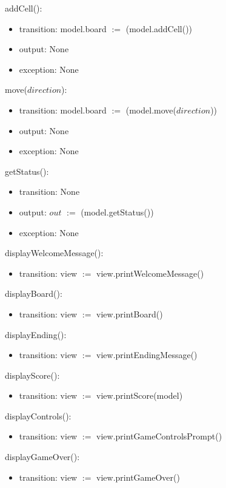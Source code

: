 \documentclass[12pt]{article}
\begin{document}
\noindent addCell():
\begin{itemize}
  \item transition: model.board $:=$ (model.addCell())
  \item output: None
  \item exception: None
\end{itemize}

\noindent move($direction$):
\begin{itemize}
  \item transition: model.board $:=$ (model.move($direction$))
  \item output: None
  \item exception: None
\end{itemize}

\noindent getStatus():
\begin{itemize}
  \item transition: None
  \item output: $out$ $:=$ (model.getStatus())
  \item exception: None
\end{itemize}

\noindent displayWelcomeMessage():
\begin{itemize}
  \item transition: view $:=$ view.printWelcomeMessage()
\end{itemize}

\noindent displayBoard():
\begin{itemize}
  \item transition: view $:=$ view.printBoard()
\end{itemize}

\noindent displayEnding():
\begin{itemize}
  \item transition: view $:=$ view.printEndingMessage()
\end{itemize}

\noindent displayScore():
\begin{itemize}
  \item transition: view $:=$ view.printScore(model)
\end{itemize}

\noindent displayControls():
\begin{itemize}
  \item transition: view $:=$ view.printGameControlsPrompt()
\end{itemize}

\noindent displayGameOver():
\begin{itemize}
  \item transition: view $:=$ view.printGameOver()
\end{itemize}
\end{document}
